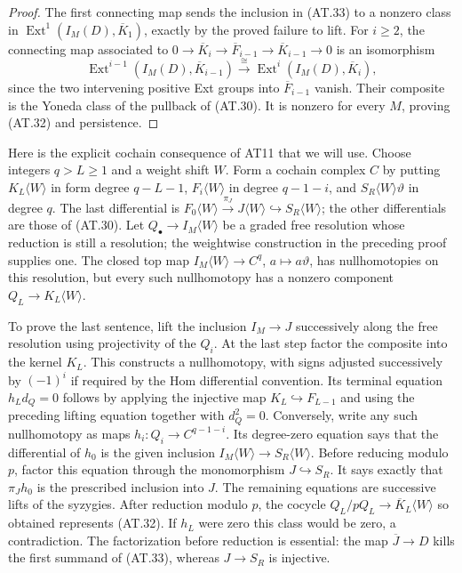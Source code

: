 \begin{proof}
The first connecting map sends the inclusion in
\textup{(AT.33)} to a nonzero class in
$\operatorname{Ext}^1(I_M(D),\overline K_1)$, exactly by
the proved failure to lift.  For $i\geq2$, the connecting
map associated to
$0\to\overline K_i\to\overline F_{i-1}
\to\overline K_{i-1}\to0$ is an isomorphism
\[
 \operatorname{Ext}^{i-1}(I_M(D),\overline K_{i-1})
 \xrightarrow{\ \cong\ }
 \operatorname{Ext}^{i}(I_M(D),\overline K_i),
\]
since the two intervening positive Ext groups into
$\overline F_{i-1}$ vanish.  Their composite is the
Yoneda class of the pullback of \textup{(AT.30)}.
It is nonzero for every $M$, proving \textup{(AT.32)}
and persistence.
\end{proof}

Here is the explicit cochain consequence of AT11 that we
will use.  Choose integers $q>L\geq1$ and a weight shift $W$.
Form a cochain complex $C$ by putting $K_L\langle W\rangle$
in form degree $q-L-1$, $F_i\langle W\rangle$ in degree
$q-1-i$, and $S_R\langle W\rangle\vartheta$ in degree $q$.
The last differential is
$F_0\langle W\rangle\xrightarrow{\pi_J}
J\langle W\rangle\hookrightarrow S_R\langle W\rangle$;
the other differentials are those of \textup{(AT.30)}.
Let $Q_\bullet\to I_M\langle W\rangle$ be a graded free
resolution whose reduction is still a resolution; the
weightwise construction in the preceding proof supplies one.
The closed top map
$I_M\langle W\rangle\to C^q$, $a\mapsto a\vartheta$,
has nullhomotopies on this resolution, but every such
nullhomotopy has a nonzero component
$Q_L\to K_L\langle W\rangle$.

To prove the last sentence, lift the inclusion $I_M\to J$
successively along the free resolution using projectivity
of the $Q_i$.  At the last step factor the composite into
the kernel $K_L$.  This constructs a nullhomotopy, with
signs adjusted successively by $(-1)^i$ if required by the
Hom differential convention.  Its terminal equation
$h_Ld_Q=0$ follows by applying the injective map
$K_L\hookrightarrow F_{L-1}$ and using the preceding
lifting equation together with $d_Q^2=0$.
Conversely, write any such
nullhomotopy as maps
$h_i:Q_i\to C^{q-1-i}$.  Its degree-zero equation says
that the differential of $h_0$ is the given inclusion
$I_M\langle W\rangle\to S_R\langle W\rangle$.
Before reducing modulo $p$, factor this equation through
the monomorphism $J\hookrightarrow S_R$.  It says exactly
that $\pi_J h_0$ is the prescribed inclusion into $J$.
The remaining equations are successive lifts of the
syzygies.  After reduction modulo $p$, the cocycle
$Q_L/pQ_L\to\overline K_L\langle W\rangle$ so obtained
represents \textup{(AT.32)}.  If $h_L$ were zero this
class would be zero, a contradiction.  The factorization
before reduction is essential: the map
$\overline J\to D$ kills the first summand of
\textup{(AT.33)}, whereas $J\to S_R$ is injective.


